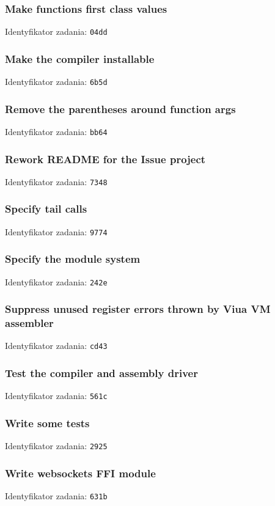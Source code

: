 \subsubsection{Make functions first class values}

Identyfikator zadania: \texttt{04dd}

\subsubsection{Make the compiler installable}

Identyfikator zadania: \texttt{6b5d}

\subsubsection{Remove the parentheses around function args}

Identyfikator zadania: \texttt{bb64}

\subsubsection{Rework README for the Issue project}

Identyfikator zadania: \texttt{7348}

\subsubsection{Specify tail calls}

Identyfikator zadania: \texttt{9774}

\subsubsection{Specify the module system}

Identyfikator zadania: \texttt{242e}

\subsubsection{Suppress unused register errors thrown by Viua VM assembler}

Identyfikator zadania: \texttt{cd43}

\subsubsection{Test the compiler and assembly driver}

Identyfikator zadania: \texttt{561c}

\subsubsection{Write some tests}

Identyfikator zadania: \texttt{2925}

\subsubsection{Write websockets FFI module}

Identyfikator zadania: \texttt{631b}
